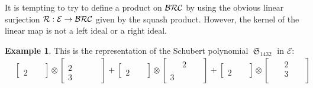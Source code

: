 \documentclass{amsart}
\theoremstyle{definition}
\newtheorem{example}[lemma]{Example}
\theoremstyle{remark}
\numberwithin{equation}{subsection}
\DeclareMathOperator{\sch}{\mathfrak{S}}
\begin{document}
It is tempting to try to define a product on $\mathcal{BRC}$ by using the obvious linear surjection $\mathcal{R}:\mathcal{E}\to\mathcal{BRC}$ given by the squash product. However, the kernel of the linear map is not a left ideal or a right ideal.
\begin{example}
  This is the representation of the Schubert polynomial $\sch_{1432}$ in $\mathcal{E}$:
\begin{align*}
&\left[\begin{matrix}\mathtt{\text{ }} & \mathtt{\text{ }}\\2 & \mathtt{\text{ }}\end{matrix}\right] \otimes \left[\begin{matrix}\mathtt{\text{ }} & \mathtt{\text{ }} & \mathtt{\text{ }}\\2 & \mathtt{\text{ }} & \mathtt{\text{ }}\\3 & \mathtt{\text{ }} & \mathtt{\text{ }}\end{matrix}\right] + \left[\begin{matrix}\mathtt{\text{ }} & \mathtt{\text{ }}\\2 & \mathtt{\text{ }}\end{matrix}\right] \otimes \left[\begin{matrix}\mathtt{\text{ }} & 2 & \mathtt{\text{ }}\\\mathtt{\text{ }} & \mathtt{\text{ }} & \mathtt{\text{ }}\\3 & \mathtt{\text{ }} & \mathtt{\text{ }}\end{matrix}\right] + \left[\begin{matrix}\mathtt{\text{ }} & \mathtt{\text{ }}\\2 & \mathtt{\text{ }}\end{matrix}\right] \otimes \left[\begin{matrix}\mathtt{\text{ }} & 2 & \mathtt{\text{ }}\\\mathtt{\text{ }} & 3 & \mathtt{\text{ }}\\\mathtt{\text{ }} & \mathtt{\text{ }} & \mathtt{\text{ }}\end{matrix}\right] \\

\end{align*}
\end{example}
\end{document}
